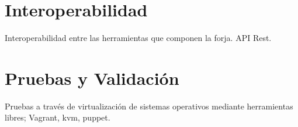 

\section{Interoperabilidad}
\label{sec:interoperabilidad}

\par Interoperabilidad entre las herramientas que componen la forja. API Rest.



\section{Pruebas y Validación}
\label{sec:pruebas-validacion}

\par Pruebas a trav\'es de virtualizaci\'on de sistemas operativos mediante herramientas libres; Vagrant, kvm, puppet.


